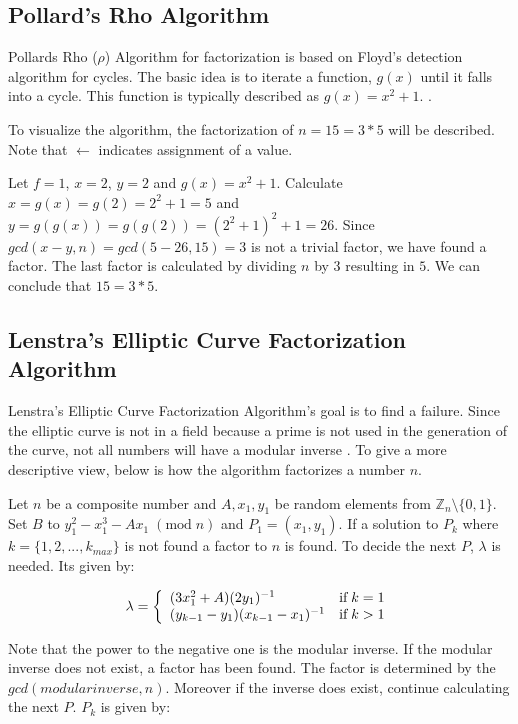 \subsection{Pollard's Rho Algorithm}
Pollards Rho ($\rho$) Algorithm for factorization is based on Floyd's detection algorithm for cycles. The basic idea is to iterate a function, $g(x)$ until it falls into a cycle. This function is typically described as $g(x)=x^2+1$. \cite{pollardsRhoAlgorithm}\cite{pollardsRhoAlgorithm2}.

To visualize the algorithm, the factorization of $n=15=3*5$ will be described. Note that $\leftarrow$ indicates assignment of a value.

Let $f=1$, $x=2$, $y=2$ and $g(x)=x^2+1$. Calculate $x=g(x)=g(2)=2^2+1=5$ and $y=g(g(x))=g(g(2))=(2^2+1)^2+1=26$. Since $gcd(x - y, n)=gcd(5 - 26, 15)=3$ is not a trivial factor, we have found a factor. The last factor is calculated by dividing $n$ by $3$ resulting in $5$. We can conclude that $15=3*5$.

\subsection{Lenstra's Elliptic Curve Factorization Algorithm}
Lenstra's Elliptic Curve Factorization Algorithm's goal is to find a failure. Since the elliptic curve is not in a field because a prime is not used in the generation of the curve, not all numbers will have a modular inverse \cite{LenstrasFactorizationAlgorithm}. To give a more descriptive view, below is how the algorithm factorizes a number $n$.

Let $n$ be a composite number and $A, x_1, y_1$ be random elements from $\mathbb{Z}_n \setminus \{0,1\}$. Set $B$ to $y_1^2 - x_1^3 - Ax_1\; (\text{mod}\;n)$ and $P_1 = (x_1,y_1)$. If a solution to $P_k$ where $k = \{1,2,...,k_{max}\}$ is not found a  factor to $n$ is found. To decide the next $P$, $\lambda$ is needed. Its given by:

\begin{equation*}
    \lambda = \left\{\begin{array}{l l}
         (3x_1^2 + A)(2y_1)^{-1} & \text{if}\; k = 1\\
         (y_{k-1} - y_1)(x_{k-1} - x_1)^{-1} & \text{if}\; k > 1
    \end{array}\right.
\end{equation*}

Note that the power to the negative one is the modular inverse. If the modular inverse does not exist, a factor has been found. The factor is determined by the $gcd(modular inverse, n)$. Moreover if the inverse does exist, continue calculating the next $P$. $P_k$ is given by:


